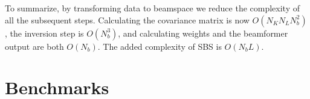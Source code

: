 \documentclass[12pt,journal,onecolumn]{IEEEtran}
\newcommand{\mat}[1]{\mathbf{#1}}
\renewcommand{\vec}[1]{\mathbf{#1}}
\begin{document}
To summarize, by transforming data to beamspace we reduce the complexity of all the subsequent steps. Calculating the covariance matrix is now $O(N_KN_LN_b^2)$, the inversion step is $O(N_b^3)$, and calculating weights and the beamformer output are both $O(N_b)$. The added complexity of SBS is $O(N_bL)$.





 

\section{Benchmarks}\label{sec:res}

\end{document}
